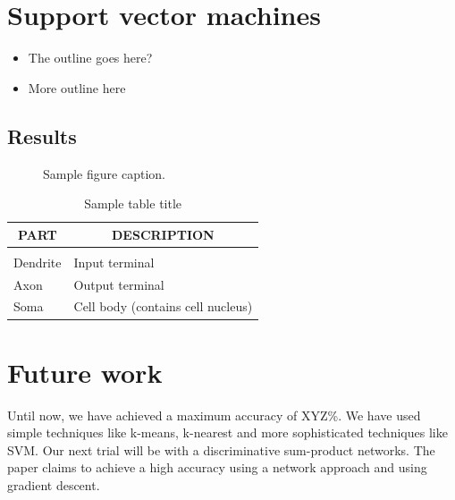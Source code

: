 \documentclass{article} %
\begin{document}

\section{Support vector machines}
    \begin{itemize}
        \item The outline goes here?
        \item More outline here
    \end{itemize}

    \subsection{Results} %
    \label{sub:Results}
    

\begin{figure}[h]
    \begin{center}
    \fbox{\rule[-.5cm]{0cm}{4cm} \rule[-.5cm]{4cm}{0cm}}
    \end{center}
    \caption{Sample figure caption.}
\end{figure}

\begin{table}[t]
    \caption{Sample table title}
    \begin{center}
        \begin{tabular}{ll}
        \multicolumn{1}{c}{\bf PART}  &\multicolumn{1}{c}{\bf DESCRIPTION}
        \\ \hline \\
        Dendrite         &Input terminal \\
        Axon             &Output terminal \\
        Soma             &Cell body (contains cell nucleus) \\
        \end{tabular}
    \end{center}
\end{table}

\section{Future work}
    Until now, we have achieved a maximum accuracy of XYZ\%. We have used simple techniques like k-means, k-nearest and more sophisticated techniques like SVM. Our next trial will be with a discriminative sum-product networks. The paper claims to achieve a high accuracy using a network approach and using gradient descent.
\end{document}
